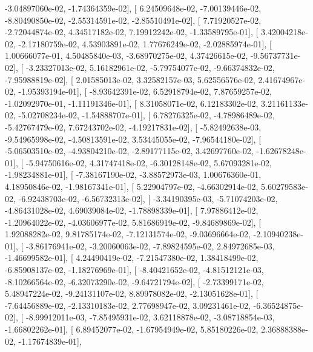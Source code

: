 \documentclass{article}
\begin{document}
         -3.04897060e-02,  -1.74364359e-02],
       [  6.24509648e-02,  -7.00139446e-02,  -8.80490850e-02,
         -2.55314591e-02,  -2.85510491e-02],
       [  7.71920527e-02,  -2.72044874e-02,   4.34517182e-02,
          7.19912242e-02,  -1.33589795e-01],
       [  3.42004218e-02,  -2.17180759e-02,   4.53903891e-02,
          1.77676249e-02,  -2.02885974e-01],
       [  1.00666077e-01,   4.50485840e-03,  -3.68970275e-02,
          4.37426615e-02,  -9.56737731e-02],
       [ -3.23327013e-02,   5.16182961e-02,  -5.79754077e-02,
         -9.66374832e-02,  -7.95988819e-02],
       [  2.01585013e-02,   3.32582157e-03,   5.62556576e-02,
          2.41674967e-02,  -1.95393194e-01],
       [ -8.93642391e-02,   6.52918794e-02,   7.87659257e-02,
         -1.02092970e-01,  -1.11191346e-01],
       [  8.31058071e-02,   6.12183302e-02,   3.21161133e-02,
         -5.02708234e-02,  -1.54888707e-01],
       [  6.78276325e-02,  -4.78986489e-02,  -5.42767479e-02,
          7.67243702e-02,  -4.19217831e-02],
       [ -5.82492638e-03,  -9.54965998e-02,  -4.50813591e-02,
          3.53445055e-02,  -7.96544180e-02],
       [ -5.06503510e-02,  -4.93804210e-02,  -2.89177115e-02,
          3.42697760e-02,  -1.62678248e-01],
       [ -5.94750616e-02,   4.31747418e-02,  -6.30128148e-02,
          5.67093281e-02,  -1.98234881e-01],
       [ -7.38167190e-02,  -3.88572973e-03,   1.00676360e-01,
          4.18950846e-02,  -1.98167341e-01],
       [  5.22904797e-02,  -4.66302914e-02,   5.60279583e-02,
         -6.92438703e-02,  -6.56732313e-02],
       [ -3.34190395e-03,  -5.71074203e-02,  -4.86431028e-02,
          4.69039084e-02,  -1.78898339e-01],
       [  7.97886412e-02,  -1.20964022e-02,  -4.03606977e-02,
          5.81686919e-02,  -9.84689869e-02],
       [  1.92088282e-02,   9.81785174e-02,  -7.12131574e-02,
         -9.03696664e-02,  -2.10940238e-01],
       [ -3.86176941e-02,  -3.20060063e-02,  -7.89824595e-02,
          2.84972685e-03,  -1.46699582e-01],
       [  4.24490419e-02,  -7.21547380e-02,   1.38418499e-02,
         -6.85908137e-02,  -1.18276969e-01],
       [ -8.40421652e-02,  -4.81512121e-03,  -8.10266564e-02,
         -6.32073290e-02,  -9.64721794e-02],
       [ -2.73399171e-02,   5.48947224e-02,  -9.24131107e-02,
          8.89978082e-02,  -2.13051628e-01],
       [ -7.64456889e-02,  -2.13310183e-02,   2.77698947e-02,
          3.09231461e-02,  -6.36524875e-02],
       [ -8.99912011e-03,  -7.85495931e-02,   3.62118878e-02,
         -3.08718854e-03,  -1.66802262e-01],
       [  6.89452077e-02,  -1.67954949e-02,   5.85180226e-02,
          2.36888388e-02,  -1.17674839e-01],
\end{document}
